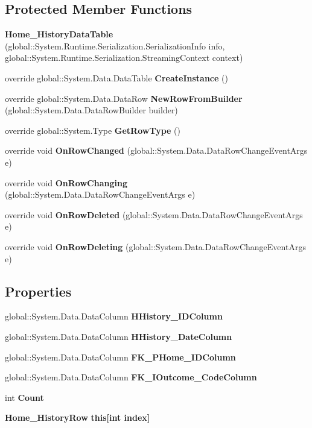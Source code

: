 \subsection*{Protected Member Functions}
\begin{DoxyCompactItemize}
\item 
\textbf{ Home\+\_\+\+History\+Data\+Table} (global\+::\+System.\+Runtime.\+Serialization.\+Serialization\+Info info, global\+::\+System.\+Runtime.\+Serialization.\+Streaming\+Context context)
\item 
override global\+::\+System.\+Data.\+Data\+Table \textbf{ Create\+Instance} ()
\item 
override global\+::\+System.\+Data.\+Data\+Row \textbf{ New\+Row\+From\+Builder} (global\+::\+System.\+Data.\+Data\+Row\+Builder builder)
\item 
override global\+::\+System.\+Type \textbf{ Get\+Row\+Type} ()
\item 
override void \textbf{ On\+Row\+Changed} (global\+::\+System.\+Data.\+Data\+Row\+Change\+Event\+Args e)
\item 
override void \textbf{ On\+Row\+Changing} (global\+::\+System.\+Data.\+Data\+Row\+Change\+Event\+Args e)
\item 
override void \textbf{ On\+Row\+Deleted} (global\+::\+System.\+Data.\+Data\+Row\+Change\+Event\+Args e)
\item 
override void \textbf{ On\+Row\+Deleting} (global\+::\+System.\+Data.\+Data\+Row\+Change\+Event\+Args e)
\end{DoxyCompactItemize}
\subsection*{Properties}
\begin{DoxyCompactItemize}
\item 
global\+::\+System.\+Data.\+Data\+Column \textbf{ H\+History\+\_\+\+I\+D\+Column}\hspace{0.3cm}{\ttfamily  [get]}
\item 
global\+::\+System.\+Data.\+Data\+Column \textbf{ H\+History\+\_\+\+Date\+Column}\hspace{0.3cm}{\ttfamily  [get]}
\item 
global\+::\+System.\+Data.\+Data\+Column \textbf{ F\+K\+\_\+\+P\+Home\+\_\+\+I\+D\+Column}\hspace{0.3cm}{\ttfamily  [get]}
\item 
global\+::\+System.\+Data.\+Data\+Column \textbf{ F\+K\+\_\+\+I\+Outcome\+\_\+\+Code\+Column}\hspace{0.3cm}{\ttfamily  [get]}
\item 
int \textbf{ Count}\hspace{0.3cm}{\ttfamily  [get]}
\item 
\textbf{ Home\+\_\+\+History\+Row} \textbf{ this[int index]}\hspace{0.3cm}{\ttfamily  [get]}
\end{DoxyCompactItemize}
